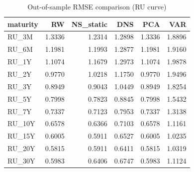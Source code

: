 \begin{table}
\caption{Out-of-sample RMSE comparison (RU curve)}
\label{tab:6_3_ru}
\begin{tabular}{lrrrrr}
\toprule
maturity & RW & NS_static & DNS & PCA & VAR \\
\midrule
RU_3M & 1.3336 & 1.2314 & 1.2898 & 1.3336 & 1.8896 \\
RU_6M & 1.1981 & 1.1993 & 1.2877 & 1.1981 & 1.9160 \\
RU_1Y & 1.1074 & 1.1679 & 1.2973 & 1.1074 & 1.9878 \\
RU_2Y & 0.9770 & 1.0218 & 1.1750 & 0.9770 & 1.9496 \\
RU_3Y & 0.8949 & 0.9043 & 1.0449 & 0.8949 & 1.8254 \\
RU_5Y & 0.7998 & 0.7823 & 0.8845 & 0.7998 & 1.5432 \\
RU_7Y & 0.7337 & 0.7123 & 0.7953 & 0.7337 & 1.3138 \\
RU_10Y & 0.6578 & 0.6366 & 0.7103 & 0.6578 & 1.1161 \\
RU_15Y & 0.6005 & 0.5911 & 0.6527 & 0.6005 & 1.0235 \\
RU_20Y & 0.5815 & 0.5911 & 0.6411 & 0.5815 & 1.0319 \\
RU_30Y & 0.5983 & 0.6406 & 0.6747 & 0.5983 & 1.1124 \\
\bottomrule
\end{tabular}
\end{table}
